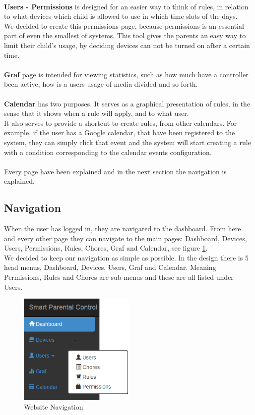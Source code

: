 \\
\textbf{Users - Permissions} is designed for an easier way to think of rules, in relation to what devices which child is allowed to use in which time slots of the days.\\
We decided to create this permissions page, because permissions is an essential part of even the smallest of systems. This tool gives the parents an easy way to limit their child’s usage, by deciding devices can not be turned on after a certain time.\\
\\
\textbf{Graf} page is intended for viewing statistics, such as how much have a controller been active, how is a users usage of media divided and so forth.\\
\\
\textbf{Calendar} has two purposes. It serves as a graphical presentation of rules, in the sense that it shows when a rule will apply, and to what user.\\
It also serves to provide a shortcut to create rules, from other calendars. For example, if the user has a Google calendar, that have been registered to the system, they can simply click that event and the system will start creating a rule with a condition corresponding to the calendar events configuration.\\
\\
Every page have been explained and in the next section the navigation is explained.
\subsection{Navigation}
When the user has logged in, they are navigated to the dashboard. From here and every other page they can navigate to the main pages: Dashboard, Devices, Users, Permissions, Rules, Chores, Graf and Calendar, see figure \ref{fig:navigationOfWebsite}.\\
We decided to keep our navigation as simple as possible. In the design there is 5 head menus, Dashboard, Devices, Users, Graf and Calendar. Meaning Permissions, Rules and Chores are sub-menus and these are all listed under Users.\\


\begin{figure}[htbp]
	\centering
		\includegraphics[width=0.50\textwidth]{images/navigationOfWebsite.png}
	\caption{Website Navigation}
	\label{fig:navigationOfWebsite}
\end{figure}


